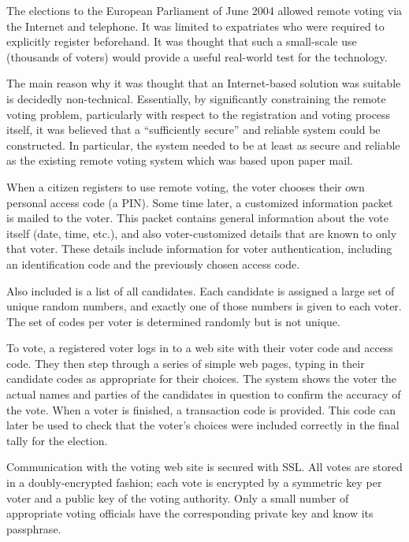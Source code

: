 \documentclass[times, 10pt, twocolumn]{article}
\begin{document}
The elections to the European Parliament of June 2004 allowed remote voting via 
the Internet and telephone.  It was limited to 
expatriates who were required to explicitly register beforehand.  It was thought that such
a small-scale use (thousands of voters) would provide a useful real-world test 
for the technology.

The main reason why it was thought that an Internet-based solution was suitable 
is decidedly non-technical.  Essentially, by significantly constraining the 
remote voting problem, particularly with respect to the registration and voting 
process itself, it was believed that a ``sufficiently secure'' and reliable
system 
could be constructed.  In particular, the system needed to be at least as 
secure and reliable as the existing remote voting system which was based upon 
paper mail.


When a citizen registers to use remote voting, the voter chooses their own 
personal access code (a PIN). Some time later, a customized information packet 
is mailed to the voter. This packet contains general information about the vote 
itself (date, time, etc.), and also voter-customized details that are known to 
only that voter. These details include information for voter authentication, 
including an identification code and the previously chosen access code.

Also included is a list of all candidates. Each candidate is assigned a large 
set of unique random numbers, and exactly one of those numbers is given to each 
voter. The set of codes per voter is determined randomly but is not unique.

To vote, a registered voter logs in to a web site with their voter code and 
access code. They then step through a series of simple web pages, typing in 
their candidate codes as appropriate for their choices. The system shows the 
voter the actual names and parties of the candidates in question to confirm the 
accuracy of the vote. When a voter is finished, a transaction code is provided. 
This code can later be used to check that the voter's choices were included 
correctly in the final tally for the election.

Communication with the voting web site is secured with SSL. All votes are 
stored in a doubly-encrypted fashion; each vote is encrypted by a symmetric key 
per voter and a public key of the voting authority. Only a small number of 
appropriate voting officials have the corresponding private key and know its 
passphrase.
\end{document}
